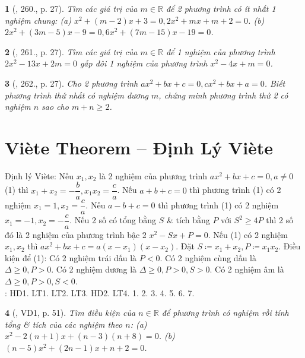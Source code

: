 \documentclass{article}
\newtheorem{baitoan}{}
\begin{document}
\begin{baitoan}[\cite{Binh_Toan_9_tap_2}, 260., p. 27]
	Tìm các giá trị của $m\in\mathbb{R}$ để 2 phương trình có ít nhất 1 nghiệm chung: (a) $x^2 + (m - 2)x + 3 = 0,2x^2 + mx + m + 2 = 0$. (b) $2x^2 + (3m - 5)x - 9 = 0,6x^2 + (7m - 15)x - 19 = 0$.
\end{baitoan}

\begin{baitoan}[\cite{Binh_Toan_9_tap_2}, 261., p. 27]
	Tìm các giá trị của $m\in\mathbb{R}$ để 1 nghiệm của phương trình $2x^2 - 13x + 2m = 0$ gấp đôi 1 nghiệm của phương trình $x^2 - 4x + m = 0$.
\end{baitoan}

\begin{baitoan}[\cite{Binh_Toan_9_tap_2}, 262., p. 27]
	Cho 2 phương trình $ax^2 + bx + c = 0,cx^2 + bx + a = 0$. Biết phương trình thứ nhất có nghiệm dương $m$, chứng minh phương trình thứ 2 có nghiệm $n$ sao cho $m + n\ge2$.
\end{baitoan}


\section{Vi\`ete Theorem -- Định Lý Vi\`ete}
 Định lý Vi\`ete: Nếu $x_1,x_2$ là 2 nghiệm của phương trình $ax^2 + bx + c = 0,a\ne0$ (1) thì $x_1 + x_2 = -\dfrac{b}{a},x_1x_2 = \dfrac{c}{a}$.  Nếu $a + b + c = 0$ thì phương trình (1) có 2 nghiệm $x_1 = 1,x_2 = \dfrac{c}{a}$. Nếu $a - b + c = 0$ thì phương trình (1) có 2 nghiệm $x_1 = -1,x_2 = -\dfrac{c}{a}$.  Nếu 2 số có tổng bằng $S$ \& tích bằng $P$ với $S^2\ge4P$ thì 2 số đó là 2 nghiệm của phương trình bậc 2 $x^2 - Sx + P = 0$.  Nếu (1) có 2 nghiệm $x_1,x_2$ thì $ax^2 + bx + c = a(x - x_1)(x - x_2)$.  Đặt $S\coloneqq x_1 + x_2,P\coloneqq x_1x_2$. Điều kiện để (1): Có 2 nghiệm trái dấu là $P < 0$. Có 2 nghiệm cùng dấu là $\Delta\ge0,P > 0$. Có 2 nghiệm dương là $\Delta\ge0,P > 0,S > 0$. Có 2 nghiệm âm là $\Delta\ge0,P > 0,S < 0$.\\

\noindent\cite[Chap. VII, \S3, pp. 61--65]{SGK_Toan_9_Canh_Dieu_tap_2}: HD1. LT1. LT2. LT3. HD2. LT4. 1. 2. 3. 4. 5. 6. 7.

\begin{baitoan}[\cite{Binh_boi_duong_Toan_9_tap_2}, VD1, p. 51]
	Tìm điều kiện của $n\in\mathbb{R}$ để phương trình có nghiệm rồi tính tổng \& tích của các nghiệm theo $n$: (a) $x^2 - 2(n + 1)x + (n - 3)(n + 8) = 0$. (b) $(n - 5)x^2 + (2n - 1)x + n + 2 = 0$.
\end{baitoan}
\end{document}
